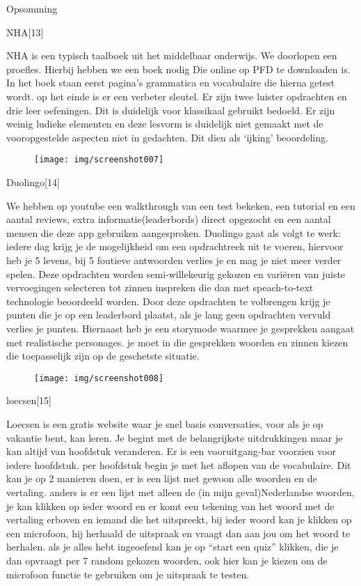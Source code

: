 \documentclass{hogent-article}
\begin{document}
Opsomming

NHA[13]

NHA is een typisch taalboek uit het middelbaar onderwijs. We doorlopen een proefles. Hierbij hebben we een boek nodig Die online op PFD te downloaden is. In het boek staan eerst pagina’s grammatica en vocabulaire die hierna getest wordt. op het einde is er een verbeter sleutel. Er zijn twee luister opdrachten en drie leer oefeningen. Dit is duidelijk voor klassikaal gebruikt bedoeld. Er zijn weinig ludieke elementen en deze lesvorm is duidelijk niet gemaakt met de vooropgestelde aspecten niet in gedachten. Dit dien als ‘ijking’ beoordeling.
\begin{figure}
    \centering
    \texttt{[image: img/screenshot007]}
    \caption{}
    \label{fig:screenshot007}
\end{figure}

Duolingo[14]

We hebben op youtube een walkthrough van een test bekeken, een tutorial en een aantal reviews, extra informatie(leaderbords) direct opgezocht en een aantal mensen die deze app gebruiken aangesproken. Duolingo gaat als volgt te werk: iedere dag krijg je de mogelijkheid om een opdrachtreek uit te voeren, hiervoor heb je 5 levens, bij 5 foutieve antwoorden verlies je en mag je niet meer verder spelen. Deze opdrachten worden semi-willekeurig gekozen en variëren van juiste vervoegingen selecteren tot  zinnen inspreken die dan met speach-to-text technologie beoordeeld worden. Door deze opdrachten te volbrengen krijg je punten die je op een leaderbord plaatst, als je  lang geen opdrachten vervuld verlies je punten. Hiernaast heb je een storymode waarmee je gesprekken aangaat met realistische personages. je moet in die gesprekken woorden en zinnen kiezen die toepasselijk zijn op de geschetste situatie.

\begin{figure}
    \centering
    \texttt{[image: img/screenshot008]}
    \caption{}
    \label{fig:screenshot008}
\end{figure}

loecsen[15]

Loecsen is een gratis website waar je snel basis conversaties, voor als je op vakantie bent, kan leren. Je begint met de belangrijkste uitdrukkingen maar je kan altijd van hoofdstuk veranderen. Er is een vooruitgang-bar voorzien voor iedere hoofdstuk. per hoofdstuk begin je met het aflopen van de vocabulaire. Dit kan je op 2 manieren doen, er is een lijst met gewoon alle woorden en de vertaling. anders is er een lijst met alleen de (in mijn geval)Nederlandse woorden, je kan klikken op ieder woord en er komt een tekening van het woord met de vertaling erboven en iemand die het uitspreekt, bij ieder woord kan je klikken op een microfoon, hij herhaald de uitspraak en vraagt dan aan jou om het woord te herhalen. als je alles hebt ingeoefend kan je op “start een quiz” klikken, die je dan opvraagt per 7 random gekozen woorden, ook hier kan je kiezen om de microfoon functie te gebruiken om je uitspraak te testen.
\end{document}
